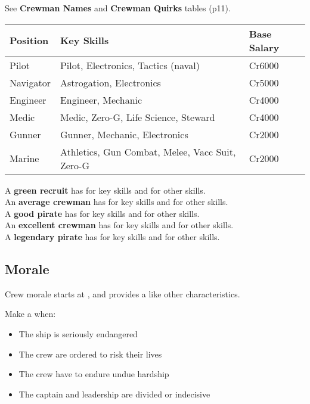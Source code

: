 \documentclass{cheatsheet}
\begin{document}
\begin{multicols}{2}
See \textbf{Crewman Names} and \textbf{Crewman Quirks} tables (p11).

\begin{tabularx}{\linewidth}{lXl} \toprule
Position & Key Skills & Base Salary \\ \midrule
Pilot & Pilot, Electronics, Tactics (naval) & Cr6000 \\
Navigator & Astrogation, Electronics & Cr5000 \\
Engineer & Engineer, Mechanic & Cr4000 \\
Medic & Medic, Zero-G, Life Science, Steward & Cr4000 \\
Gunner & Gunner, Mechanic, Electronics & Cr2000 \\
Marine & Athletics, Gun Combat, Melee, Vacc Suit, Zero-G & Cr2000 \\ \bottomrule
\end{tabularx}

A \textbf{green recruit} has  for key skills and  for other skills.\\
An \textbf{average crewman} has  for key skills and  for other skills.\\
A \textbf{good pirate} has  for key skills and  for other skills.\\
An \textbf{excellent crewman} has  for key skills and  for other skills.\\
A \textbf{legendary pirate} has  for key skills and  for other skills.

\subsection{Morale}

Crew morale starts at , and provides a \diemod{} like
other characteristics.

Make a  when:

\begin{itemize}
\item The ship is seriously endangered
\item The crew are ordered to risk their lives
\item The crew have to endure undue hardship
\item The captain and leadership are divided or indecisive
\end{itemize}


\end{multicols}
\end{document}
